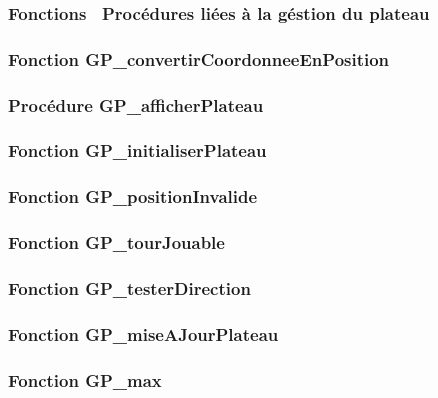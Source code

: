\documentclass{report}
\begin{document}
             

              \subsubsection{Fonctions \ Procédures liées à la géstion du plateau}
             \subsubsection{Fonction GP\_convertirCoordonneeEnPosition}
                  \bigskip 
             \subsubsection{Procédure GP\_afficherPlateau}
                   \bigskip
             \subsubsection{Fonction GP\_initialiserPlateau}
                   \bigskip 
             \subsubsection{Fonction GP\_positionInvalide}
                   \bigskip    
             \subsubsection{Fonction GP\_tourJouable}
                       \bigskip
             \subsubsection{Fonction GP\_testerDirection}
                    \bigskip  
             \subsubsection{Fonction GP\_miseAJourPlateau}
                  \bigskip    
             \subsubsection{Fonction GP\_max}
                      \bigskip
\end{document}
